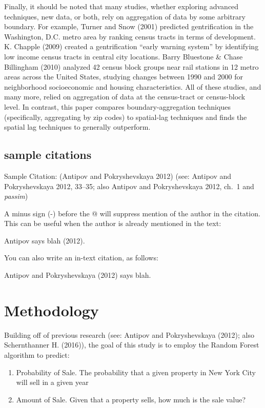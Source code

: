 \documentclass[]{article}
\providecommand{\tightlist}{%
  \setlength{\itemsep}{0pt}\setlength{\parskip}{0pt}}
\begin{document}
Finally, it should be noted that many studies, whether exploring
advanced techniques, new data, or both, rely on aggregation of data by
some arbitrary boundary. For example, Turner and Snow (2001) predicted
gentrification in the Washington, D.C. metro area by ranking census
tracts in terms of development. K. Chapple (2009) created a
gentrification ``early warning system'' by identifying low income census
tracts in central city locations. Barry Bluestone \& Chase Billingham
(2010) analyzed 42 census block groups near rail stations in 12 metro
areas across the United States, studying changes between 1990 and 2000
for neighborhood socioeconomic and housing characteristics. All of these
studies, and many more, relied on aggregation of data at the
census-tract or census-block level. In contrast, this paper compares
boundary-aggregation techniques (specifically, aggregating by zip codes)
to spatial-lag techniques and finds the spatial lag techniques to
generally outperform.

\subsection{sample citations}\label{sample-citations}

Sample Citation: (Antipov and Pokryshevskaya 2012) (see: Antipov and
Pokryshevskaya 2012, 33--35; also Antipov and Pokryshevskaya 2012, ch.~1
and \emph{passim})

A minus sign (-) before the @ will suppress mention of the author in the
citation. This can be useful when the author is already mentioned in the
text:

Antipov says blah (2012).

You can also write an in-text citation, as follows:

Antipov and Pokryshevskaya (2012) says blah.

\section{Methodology}\label{methodology}

Building off of previous research (see: Antipov and Pokryshevskaya
(2012); also Schernthanner H. (2016)), the goal of this study is to
employ the Random Forest algorithm to predict:

\begin{enumerate}
\def\labelenumi{\arabic{enumi})}
\tightlist
\item
  Probability of Sale. The probability that a given property in New York
  City will sell in a given year
\item
  Amount of Sale. Given that a property sells, how much is the sale
  value?
\end{enumerate}
\end{document}
